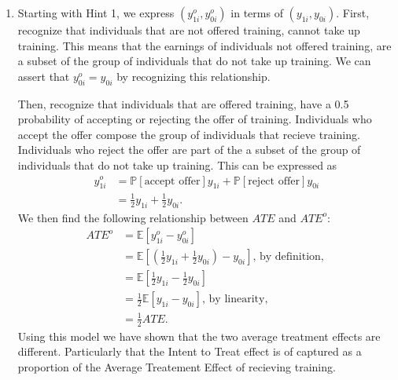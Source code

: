 \documentclass[
]{article}
\providecommand{\tightlist}{%
  \setlength{\itemsep}{0pt}\setlength{\parskip}{0pt}}
\begin{document}
\begin{enumerate}
\def\labelenumi{\arabic{enumi}.}
\setcounter{enumi}{3}
\tightlist
\item
  Starting with Hint 1, we express \((y_{1i}^o, y_{0i}^o)\) in terms of
  \((y_{1i}, y_{0i})\). First, recognize that individuals that are not
  offered training, cannot take up training. This means that the
  earnings of individuals not offered training, are a subset of the
  group of individuals that do not take up training. We can assert that
  \(y_{0i}^o = y_{0i}\) by recognizing this relationship.

  \par\medskip

  Then, recognize that individuals that are offered training, have a 0.5
  probability of accepting or rejecting the offer of training.
  Individuals who accept the offer compose the group of individuals that
  recieve training. Individuals who reject the offer are part of the a
  subset of the group of individuals that do not take up training. This
  can be expressed as \begin{align*}
   y_{1i}^o &= \mathbb{P}[\text{accept offer}]y_{1i} + \mathbb{P}[\text{reject offer}]y_{0i}\\ 
   &= \frac{1}{2}y_{1i} + \frac{1}{2}y_{0i}.
  \end{align*} We then find the following relationship between \(ATE\)
  and \(ATE^o\): \begin{align*}
   ATE^o &= \mathbb{E}[y_{1i}^o - y_{0i}^o]\\
   &= \mathbb{E}[(\frac{1}{2}y_{1i} + \frac{1}{2}y_{0i}) - y_{0i}] \text{, by definition, }\\
   &= \mathbb{E}[\frac{1}{2}y_{1i} - \frac{1}{2}y_{0i}]\\
   &= \frac{1}{2}\mathbb{E}[y_{1i} - y_{0i}] \text{, by linearity, }\\
   &= \frac{1}{2}ATE.
  \end{align*} Using this model we have shown that the two average
  treatment effects are different. Particularly that the Intent to Treat
  effect is of captured as a proportion of the Average Treatement Effect
  of recieving training.
\end{enumerate}
\end{document}

